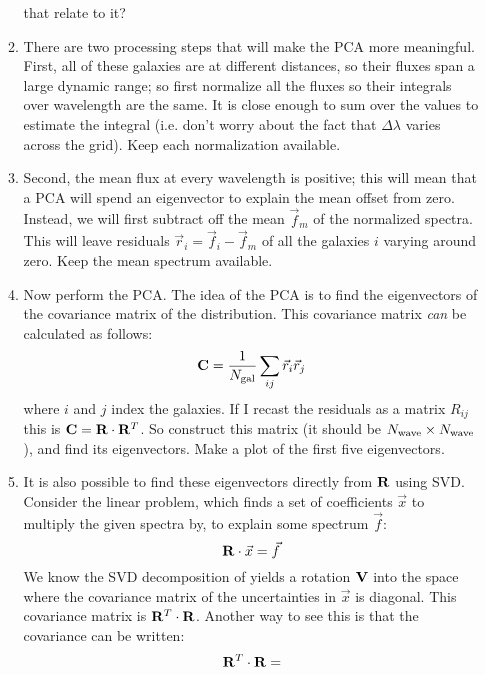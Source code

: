 \documentclass[11pt, preprint]{aastex}
\begin{document}
\begin{enumerate}
\begin{enumerate}
      that relate to it?
    \item There are two processing steps that will make the PCA more
      meaningful. First, all of these galaxies are at different
      distances, so their fluxes span a large dynamic range; so first
      normalize all the fluxes so their integrals over wavelength are
      the same. It is close enough to sum over the values to estimate
      the integral (i.e. don't worry about the fact that
      $\Delta\lambda$ varies across the grid). Keep each normalization
      available.
     \item Second, the mean flux at every wavelength is positive; this
       will mean that a PCA will spend an eigenvector to explain the
       mean offset from zero. Instead, we will first subtract off the
       mean $\vec{f}_m$ of the normalized spectra. This will leave
       residuals $\vec{r}_i = \vec{f}_i - \vec{f}_m$ of all the
       galaxies $i$ varying around zero. Keep the mean spectrum
       available.
     \item Now perform the PCA. The idea of the PCA is to find the
       eigenvectors of the covariance matrix of the distribution. This
       covariance matrix {\it can} be calculated as follows:
       \begin{equation}
         {\bf C} = \frac{1}{N_{\rm gal}} \sum_{ij} \vec{r}_i \vec{r}_j
       \end{equation}
       where $i$ and $j$ index the galaxies. If I recast the residuals
       as a matrix $R_{ij}$ this is ${\bf C} =
       {\bf R}\cdot{\bf R}^T$. So construct this matrix (it should be
       $N_{\rm wave}\times N_{\rm wave}$), and find its
       eigenvectors. Make a plot of the first five eigenvectors.
     \item It is also possible to find these eigenvectors directly
       from ${\bf R}$ using SVD. Consider the linear problem, which
       finds a set of coefficients $\vec{x}$ to multiply the given
       spectra by, to explain some spectrum $\vec{f}$:
       \begin{equation}
         {\bf R}\cdot\vec{x} = \vec{f}
       \end{equation}
       We know the SVD decomposition of  yields a rotation
       ${\bf V}$ into the space where the covariance matrix of the
       uncertainties in $\vec{x}$ is diagonal. This covariance matrix
       is ${\bf R}^T\cdot{\bf R}$. Another way to see this is that the
       covariance can be written:
       \begin{equation}
         \mat{R}^T\cdot\mat{R} =

\end{equation}
\end{enumerate}
\end{enumerate}
\end{document}
